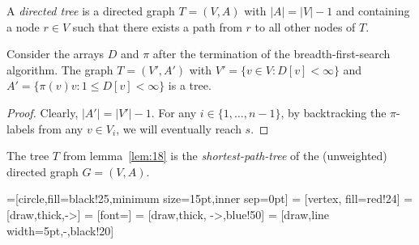\begin{definition}
  \label{f:def:6}
  A \emph{directed  tree} is a directed graph $T = (V,A)$ with 
  $|A| = |V| -1$ and containing a node $r \in V$ such that there 
  exists a path from $r$ to all other nodes of $T$. 
\end{definition}



\begin{lemma}
  \label{lem:18}
  Consider the arrays $D$ and $\pi$ after the termination of the
  breadth-first-search algorithm. 
  The graph $T = (V',A')$ with $V' = \{v \in V \colon D[v]<\infty\}$ and $A' =
  \{ \pi(v) v \colon 1\leq D[v]<\infty\}$ is a tree. 
\end{lemma}


\begin{proof}
  Clearly, $|A'| = |V'| -1$. For any $i \in \{1,\ldots,n-1\}$, by
  backtracking the $\pi$-labels from any $v \in V_i$, we will eventually
  reach $s$.
\end{proof}

\begin{definition}
  \label{f:def:7}
  The tree $T$ from lemma~\ref{lem:18} is the \emph{shortest-path-tree}
   of the (unweighted) directed graph $G = (V,A)$. 
\end{definition}



  =[circle,fill=black!25,minimum size=15pt,inner sep=0pt]
   = [vertex, fill=red!24]
   = [draw,thick,->]
   = [font=\small]
   = [draw,thick, ->,blue!50]
   = [draw,line width=5pt,-,black!20]

